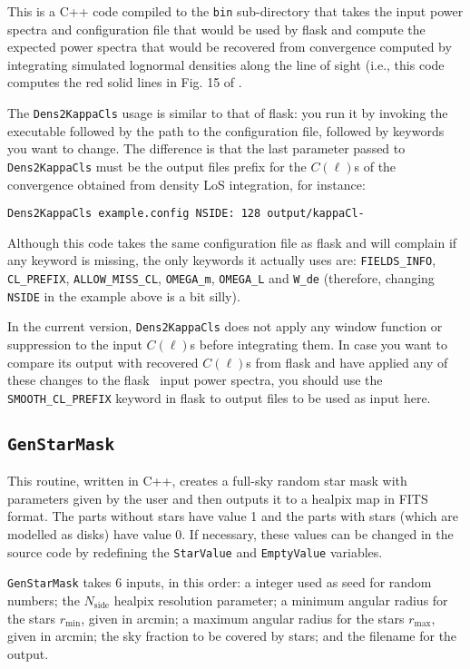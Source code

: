 \documentclass[12pt]{book} %
\newcommand{\nv}[1]{\mathrm{#1}}                 %
\begin{document}
This is a C++ code compiled to the {\tt bin} sub-directory that takes the input power spectra and 
configuration file that would be used by {\sc flask} and compute the expected power spectra that 
would be recovered from convergence computed by integrating simulated lognormal densities along 
the line of sight (i.e., this code computes the red solid lines in Fig. 15 of \citet{Xavier16mn}. 

The {\tt Dens2KappaCls} usage is similar to that of {\sc flask}: you run it by invoking the 
executable followed by the path to the configuration file, followed by keywords you want to 
change. The difference is that the last parameter passed to {\tt Dens2KappaCls} must be the 
output files prefix for the $C(\ell)$s of the convergence obtained from density LoS integration, 
for instance:

\noindent
{\tt Dens2KappaCls example.config NSIDE: 128 output/kappaCl-}

Although this code takes the same configuration file as {\sc flask} and will complain if any 
keyword is missing, the only keywords it actually uses are: {\tt FIELDS\_INFO}, 
{\tt CL\_PREFIX}, {\tt ALLOW\_MISS\_CL}, {\tt OMEGA\_m}, {\tt OMEGA\_L} and 
{\tt W\_de} (therefore, changing {\tt NSIDE} in the example 
above is a bit silly).

In the current version, {\tt Dens2KappaCls} does not apply any window function or suppression 
to the input $C(\ell)$s before integrating them. In case you want to compare its output with 
recovered $C(\ell)$s from {\sc flask} and have applied any of these changes to the {\sc flask} \
input power spectra, you should use the {\tt SMOOTH\_CL\_PREFIX} keyword in {\sc flask} to 
output files to be used as input here.

\subsection{{\tt GenStarMask}}
\label{sec:genstarmask}

This routine, written in C++, creates a full-sky random star mask with parameters given by the user and 
then outputs it to a {\sc healpix} map in FITS format. The parts without stars have value 1 and 
the parts with stars (which are modelled as disks) have value 0. If necessary, these values 
can be changed in the source code by redefining the {\tt StarValue} and {\tt EmptyValue} 
variables.

{\tt GenStarMask} takes 6 inputs, in this order: a integer used as seed for random numbers; 
the $N_{\nv{side}}$ {\sc healpix} resolution parameter; a minimum angular radius for the stars $r_{\nv{min}}$, given 
in arcmin; a maximum angular radius for the stars $r_{\nv{max}}$, given in arcmin; the sky fraction to be covered 
by stars; and the filename for the output.
\end{document}
